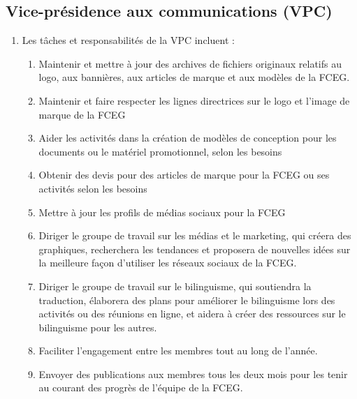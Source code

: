 \subsection{Vice-présidence aux communications (VPC)}
\label{executif-national-vice-presidence-aux-communications-vpc}

\begin{enumerate}
 \item Les tâches et responsabilités de la VPC incluent :
  \begin{enumerate}
   \item Maintenir et mettre à jour des archives de fichiers originaux relatifs au logo, aux bannières, aux articles de marque et aux modèles de la FCEG.
   \item Maintenir et faire respecter les lignes directrices sur le logo et l'image de marque de la FCEG
   \item Aider les activités dans la création de modèles de conception pour les documents ou le matériel promotionnel, selon les besoins
   \item Obtenir des devis pour des articles de marque pour la FCEG ou ses activités selon les besoins
   \item Mettre à jour les profils de médias sociaux pour la FCEG
   \item Diriger le groupe de travail sur les médias et le marketing, qui créera des graphiques, recherchera les tendances et proposera de nouvelles idées sur la meilleure façon d'utiliser les réseaux sociaux de la FCEG.
   \item Diriger le groupe de travail sur le bilinguisme, qui soutiendra la traduction, élaborera des plans pour améliorer le bilinguisme lors des activités ou des réunions en ligne, et aidera à créer des ressources sur le bilinguisme pour les autres.
   \item Faciliter l'engagement entre les membres tout au long de l'année.
   \item Envoyer des publications aux membres tous les deux mois pour les tenir au courant des progrès de l'équipe de la FCEG.
  \end{enumerate}
\end{enumerate}
